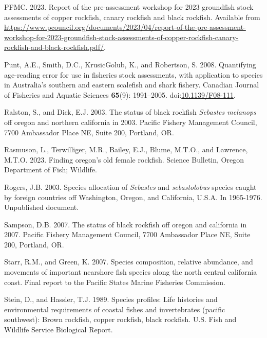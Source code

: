 \documentclass[11pt,
  english,
  letterpaper,
]{article}
\newlength{\cslhangindent}
\newenvironment{CSLReferences}[2] %
 {%
  \setlength{\parindent}{0pt}
  \ifodd #1 \everypar{\setlength{\hangindent}{\cslhangindent}}\ignorespaces\fi
  \ifnum #2 > 0
  \setlength{\parskip}{#2\baselineskip}
  \fi
 }%
 {}
\begin{document}
\begin{CSLReferences}{1}{0}
\leavevmode{}%
PFMC. 2023. Report of the pre-assessment workshop for 2023 groundfish stock assessments of copper rockfish, canary rockfish and black rockfish. Available from \url{https://www.pcouncil.org/documents/2023/04/report-of-the-pre-assessment-workshop-for-2023-groundfish-stock-assessments-of-copper-rockfish-canary-rockfish-and-black-rockfish.pdf/}.

\leavevmode{}%
Punt, A.E., Smith, D.C., KrusicGolub, K., and Robertson, S. 2008. Quantifying age-reading error for use in fisheries stock assessments, with application to species in {A}ustralia's southern and eastern scalefish and shark fishery. Canadian Journal of Fisheries and Aquatic Sciences \textbf{65}(9): 1991--2005. doi:\href{https://doi.org/10.1139/F08-111}{10.1139/F08-111}.

\leavevmode{}%
Ralston, S., and Dick, E.J. 2003. The status of black rockfish \emph{{Sebastes} melanops} off oregon and northern california in 2003. Pacific Fishery Management Council, 7700 Ambassador Place NE, Suite 200, Portland, OR.

\leavevmode{}%
Rasmuson, L., Terwilliger, M.R., Bailey, E.J., Blume, M.T.O., and Lawrence, M.T.O. 2023. Finding oregon's old female rockfish. Science Bulletin, Oregon Department of Fish; Wildlife.

\leavevmode{}%
Rogers, J.B. 2003. Species allocation of \emph{{Sebastes}} and \emph{sebastolobus} species caught by foreign countries off {Washington}, {Oregon}, and {California}, {U}.{S}.{A}. In 1965-1976. Unpublished document.

\leavevmode{}%
Sampson, D.B. 2007. The status of black rockfish off oregon and california in 2007. Pacific Fishery Management Council, 7700 Ambassador Place NE, Suite 200, Portland, OR.

\leavevmode{}%
Starr, R.M., and Green, K. 2007. Species composition, relative abundance, and movements of important nearshore fish species along the north central california coast. Final report to the Pacific States Marine Fisheries Commission.

\leavevmode{}%
Stein, D., and Hassler, T.J. 1989. Species profiles: Life histories and environmental requirements of coastal fishes and invertebrates (pacific southwest): Brown rockfish, copper rockfish, black rockfish. U.S. Fish and Wildlife Service Biological Report.


\end{CSLReferences}
\end{document}
